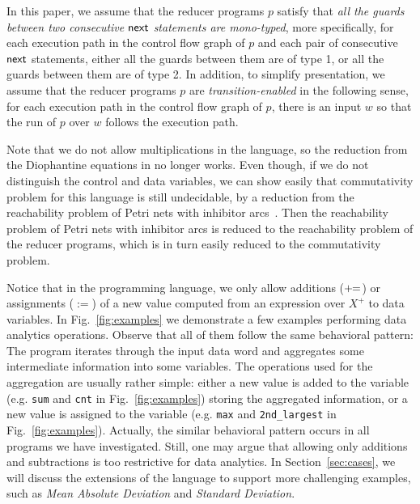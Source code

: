In this paper, we assume that the reducer programs $p$ satisfy that \emph{all the guards between two consecutive $\mathsf{next}$ statements are mono-typed}, more specifically,
for each execution path in the control flow graph of $p$ and each pair of consecutive $\mathsf{next}$ statements, either all the guards between them are of type 1, or all the guards between them are of type 2.
In addition, to simplify presentation, we assume that the reducer programs $p$ are \emph{transition-enabled} in the following sense, 
%
for each execution path in the control flow graph of $p$, there is an input $w$ so that the run of $p$ over $w$ follows the execution path.


Note that we do not allow multiplications in the language, so the reduction from the Diophantine equations in \cite{CHSW15} no longer works. Even though, if we do not distinguish the control and data variables, we can show easily that commutativity problem for this language is still undecidable, by a reduction from the reachability problem of Petri nets with inhibitor arcs~\cite{Min71,Rei08}.
Then the reachability problem of Petri nets with inhibitor arcs is reduced to the reachability problem of the reducer programs, which is in turn easily reduced to the commutativity problem.



Notice that in the programming language, we only allow additions ($+\!\!=$) or assignments ($:=$) of a new value computed from an expression over $X^+$ to data variables. 
In Fig.~\ref{fig:examples} we demonstrate a few examples performing data analytics operations. Observe that all of them follow the same behavioral pattern: The program iterates through the input data word and aggregates some intermediate information into some variables. The operations used for the aggregation are usually rather simple: either a new value is added to the variable (e.g. \texttt{sum} and \texttt{cnt} in Fig.~\ref{fig:examples}) storing the aggregated information, or a new value is assigned to the variable (e.g. \texttt{max} and \texttt{2nd\_largest} in Fig.~\ref{fig:examples}). Actually, the similar behavioral pattern occurs in all programs we have investigated.
Still, one may argue that allowing only additions and subtractions is too restrictive for data analytics. 
In Section~\ref{sec:cases}, we will discuss the extensions of the language to support more challenging examples, such as \emph{Mean Absolute Deviation} and \emph{Standard Deviation}.


